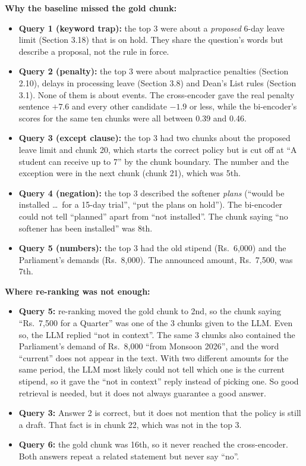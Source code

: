 \documentclass[11pt,a4paper]{article}
\begin{document}
\textbf{Why the baseline missed the gold chunk:}
\begin{itemize}
  \item \textbf{Query 1 (keyword trap):} the top 3 were about a \emph{proposed} 6-day leave limit (Section 3.18) that is on hold. They share the question's words but describe a proposal, not the rule in force.
  \item \textbf{Query 2 (penalty):} the top 3 were about malpractice penalties (Section 2.10), delays in processing leave (Section 3.8) and Dean's List rules (Section 3.1). None of them is about events. The cross-encoder gave the real penalty sentence $+7.6$ and every other candidate $-1.9$ or less, while the bi-encoder's scores for the same ten chunks were all between 0.39 and 0.46.
  \item \textbf{Query 3 (except clause):} the top 3 had two chunks about the proposed leave limit and chunk 20, which starts the correct policy but is cut off at ``A student can receive up to 7'' by the chunk boundary. The number and the exception were in the next chunk (chunk 21), which was 5th.
  \item \textbf{Query 4 (negation):} the top 3 described the softener \emph{plans} (``would be installed \ldots\ for a 15-day trial'', ``put the plans on hold''). The bi-encoder could not tell ``planned'' apart from ``not installed''. The chunk saying ``no softener has been installed'' was 8th.
  \item \textbf{Query 5 (numbers):} the top 3 had the old stipend (Rs.~6,000) and the Parliament's demands (Rs.~8,000). The announced amount, Rs.~7,500, was 7th.
\end{itemize}

\textbf{Where re-ranking was not enough:}
\begin{itemize}
  \item \textbf{Query 5:} re-ranking moved the gold chunk to 2nd, so the chunk saying ``Rs.~7,500 for a Quarter'' was one of the 3 chunks given to the LLM. Even so, the LLM replied ``not in context''. The same 3 chunks also contained the Parliament's demand of Rs.~8,000 ``from Monsoon 2026'', and the word ``current'' does not appear in the text. With two different amounts for the same period, the LLM most likely could not tell which one is the current stipend, so it gave the ``not in context'' reply instead of picking one. So good retrieval is needed, but it does not always guarantee a good answer.
  \item \textbf{Query 3:} Answer 2 is correct, but it does not mention that the policy is still a draft. That fact is in chunk 22, which was not in the top 3.
  \item \textbf{Query 6:} the gold chunk was 16th, so it never reached the cross-encoder. Both answers repeat a related statement but never say ``no''.
\end{itemize}
\end{document}
